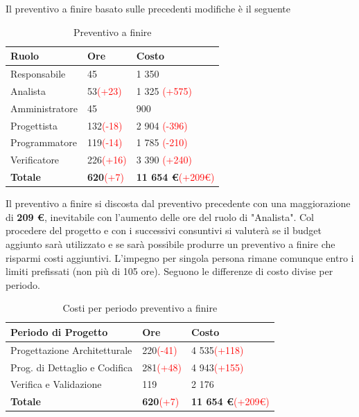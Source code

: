 \documentclass[a4paper,11pt]{article}
\begin{document}
		Il preventivo a finire basato sulle precedenti modifiche è il seguente
		
		\begin{table}[h!]
		\begin{center}
			\begin{tabular}{l l l}
			\textbf{Ruolo} & \textbf{Ore} & \textbf{Costo}\\
			\midrule
				Responsabile & 45 & 1 350\\
				Analista & 53\textcolor{red}{(+23)} & 1 325 \textcolor{red}{(+575)}\\
				Amministratore & 45 & 900\\
				Progettista & 132\textcolor{red}{(-18)} & 2 904 \textcolor{red}{(-396)}\\
				Programmatore & 119\textcolor{red}{(-14)} & 1 785 \textcolor{red}{(-210)}\\
				Verificatore & 226\textcolor{red}{(+16)} & 3 390 \textcolor{red}{(+240)}\\
			\midrule
			\textbf{Totale} & \textbf{620}\textcolor{red}{(+7)} & \textbf{11 654 \euro}\textcolor{red}{(+209\euro)}
			\end{tabular}
		\end{center}
			\caption{Preventivo a finire}
		\end{table}
	\noindent
	Il preventivo a finire si discosta dal preventivo precedente con una maggiorazione di \textbf{209 \euro}, inevitabile con l'aumento delle ore del ruolo di "Analista". Col procedere del progetto e con i successivi consuntivi si valuterà se il budget aggiunto sarà utilizzato e se sarà possibile produrre un preventivo a finire che risparmi costi aggiuntivi. L'impegno per singola persona rimane comunque entro i limiti prefissati (non più di 105 ore). Seguono  le differenze di costo divise per periodo.
	\begin{table}[h!]
	\begin{center}
		\begin{tabular}{l l l}
			\textbf{Periodo di Progetto} & \textbf{Ore} & \textbf{Costo}\\
			\midrule
			Progettazione Architetturale & 220\textcolor{red}{(-41)} & 4 535\textcolor{red}{(+118)} \\
			Prog. di Dettaglio e Codifica & 281\textcolor{red}{(+48)} & 4 943\textcolor{red}{(+155)} \\
			Verifica e Validazione & 119 & 2 176\\
			\midrule
			\textbf{Totale} & \textbf{620}\textcolor{red}{(+7)} & \textbf{11 654 \euro}\textcolor{red}{(+209\euro)}
		\end{tabular} 
		\end{center}
	\caption{Costi per periodo preventivo a finire}
	\end{table}	
	
\end{document}
